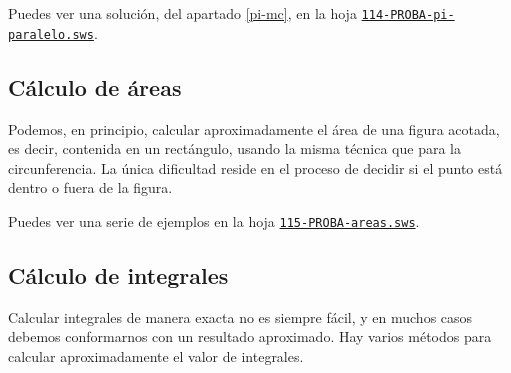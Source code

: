 Puedes ver una soluci\'on, del apartado \ref{pi-mc},  en la hoja 
\href{http://sage.mat.uam.es:8888/home/pub/??/}{\tt 114-PROBA-pi-paralelo.sws}.


\subsection{ C\'alculo de \'areas}

Podemos, en principio, calcular
aproximadamente  el \'area de una figura acotada, es decir, contenida en un
rect\'angulo, usando la misma t\'ecnica que para la circunferencia. La \'unica
dificultad reside en el proceso de decidir si el punto est\'a dentro o fuera de
la figura. 

Puedes ver una serie de ejemplos en la hoja 
\href{http://sage.mat.uam.es:8888/home/pub/??/}{\tt 115-PROBA-areas.sws}.

\subsection{ C\'alculo de integrales}

Calcular integrales de manera exacta no es siempre f\'acil, y en muchos casos
debemos conformarnos con un resultado aproximado. Hay varios m\'etodos para
calcular aproximadamente el valor de integrales.

